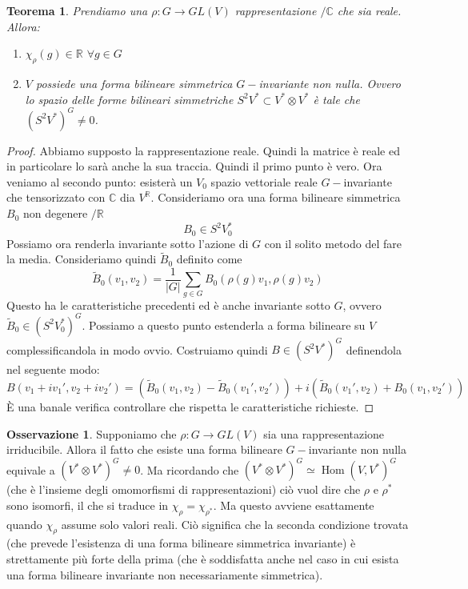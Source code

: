 \documentclass[11pt]{article}
\theoremstyle{plain}
\newtheorem{thm}{Teorema}[section]
\theoremstyle{definition}
\newtheorem*{rem}{Osservazione}
\theoremstyle{remark}
\newcommand{\C}{\mathbb{C}}
\newcommand{\R}{\mathbb{R}}
\newcommand{\dsum}{\displaystyle\sum}
\DeclareMathOperator{\Hom}{Hom}
\DeclareMathOperator{\iso}{\simeq}
\begin{document}
\begin{thm}
Prendiamo una $\rho:G\to GL(V)$ rappresentazione $/\C$ che sia reale. Allora:
\begin{enumerate}
\item $\chi_\rho(g)\in \R$ $\forall g\in G$
\item $V$ possiede una forma bilineare simmetrica $G-$invariante non nulla. Ovvero lo spazio delle forme bilineari simmetriche $S^2V^*\subset V^*\otimes V^*$ è tale che $(S^2V^*)^G\neq 0$.
\end{enumerate}
\end{thm}

\begin{proof}
Abbiamo supposto la rappresentazione reale. Quindi la matrice è reale ed in particolare lo sarà anche la sua traccia. Quindi il primo punto è vero. Ora veniamo al secondo punto: esisterà un $V_0$ spazio vettoriale reale $G-$invariante che tensorizzato con $\C$ dia $V^\R$. Consideriamo ora una forma bilineare simmetrica $B_0$ non degenere $/\R$
\[ B_0 \in S^2 V_0^*\]
Possiamo ora renderla invariante sotto l'azione di $G$ con il solito metodo del fare la media. Consideriamo quindi $\tilde B_0$ definito come
\[ \tilde B_0(v_1, v_2) = \dfrac{1}{|G|} \dsum_{g\in G} B_0(\rho(g) v_1, \rho(g) v_2)\]
Questo ha le caratteristiche precedenti ed è anche invariante sotto $G$, ovvero $\tilde B_0\in (S^2V_0^*)^G$. Possiamo a questo punto estenderla a forma bilineare su $V$ complessificandola in modo ovvio. Costruiamo quindi $B \in (S^2V^*)^G$ definendola nel seguente modo:
\[B(v_1 + i v_1', v_2 + i v_2') = \left( \tilde B_0(v_1, v_2) - \tilde B_0(v_1', v_2')\right)  + i \left( \tilde B_0(v_1', v_2) + B_0(v_1, v_2')\right)\]
\`E una banale verifica controllare che rispetta le caratteristiche richieste.
\end{proof}

\begin{rem}
Supponiamo che $\rho:G\to GL(V)$ sia una rappresentazione irriducibile. Allora il fatto che esiste una forma bilineare $G-$invariante non nulla
equivale a $(V^*\otimes V^*)^G\neq 0$. Ma ricordando che $(V^*\otimes V^*)^G \iso \Hom(V,V^*)^G$ (che è l'insieme degli omomorfismi di rappresentazioni) ciò vuol dire che $\rho$ e $\rho^*$ sono isomorfi, il che si traduce in $\chi_\rho = \chi_{\rho^*}$. Ma questo avviene esattamente quando $\chi_\rho$ assume solo valori reali. Ciò significa che la seconda condizione trovata (che prevede l'esistenza di una forma bilineare simmetrica invariante) è strettamente più forte della prima (che è soddisfatta anche nel caso in cui esista una forma bilineare invariante non necessariamente simmetrica).
\end{rem}
\end{document}
